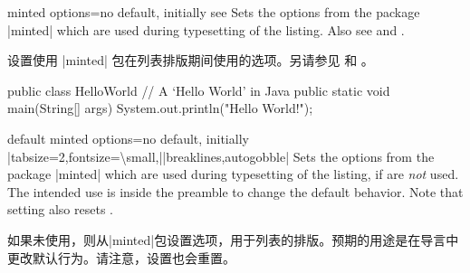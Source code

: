 \begin{docTcbKey}[][doc updated={2021-12-15}]{minted options}{=}{no default, initially
\linebreak see }
Sets the options from the package |minted| 
which are used during typesetting of the listing.
Also see  and .

设置使用 |minted|  包在列表排版期间使用的选项。另请参见  和 。
\begin{dispExample}

\begin{myjava}
public class HelloWorld {
// A `Hello World' in Java
public static void main(String[] args) {
    System.out.println("Hello World!");
}
}
\end{myjava}
\end{dispExample}
\end{docTcbKey}


\begin{docTcbKey}[][doc new={2021-12-15}]{default minted options}{=}{no default, initially
|tabsize=2,fontsize=\textbackslash small,|\linebreak|breaklines,autogobble|}
Sets the options from the package |minted| 
which are used during typesetting of the listing, if
 are \emph{not} used. The intended use is
inside the preamble to change the default behavior.
Note that setting  also resets .

如果未使用，则从|minted|包设置选项，用于列表的排版。预期的用途是在导言中更改默认行为。请注意，设置也会重置。
\begin{dispListing}
\end{dispListing}
\end{docTcbKey}



